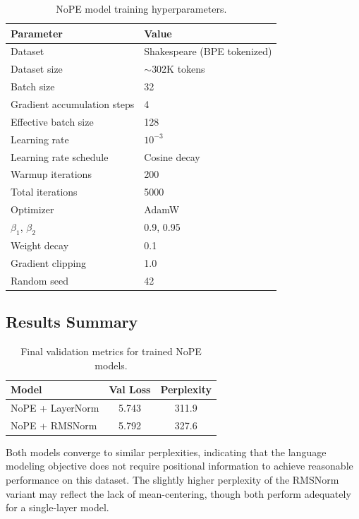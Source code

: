 \documentclass[11pt]{article}
\begin{document}
\begin{table}[htbp]
\centering
\small
\begin{tabular}{ll}
\toprule
\textbf{Parameter} & \textbf{Value} \\
\midrule
Dataset & Shakespeare (BPE tokenized) \\
Dataset size & $\sim$302K tokens \\
Batch size & 32 \\
Gradient accumulation steps & 4 \\
Effective batch size & 128 \\
Learning rate & $10^{-3}$ \\
Learning rate schedule & Cosine decay \\
Warmup iterations & 200 \\
Total iterations & 5000 \\
Optimizer & AdamW \\
$\beta_1$, $\beta_2$ & 0.9, 0.95 \\
Weight decay & 0.1 \\
Gradient clipping & 1.0 \\
Random seed & 42 \\
\bottomrule
\end{tabular}
\caption{NoPE model training hyperparameters.}
\label{tab:nope-training}
\end{table}

\subsection{Results Summary}

\begin{table}[htbp]
\centering
\small
\begin{tabular}{lcc}
\toprule
\textbf{Model} & \textbf{Val Loss} & \textbf{Perplexity} \\
\midrule
NoPE + LayerNorm & 5.743 & 311.9 \\
NoPE + RMSNorm & 5.792 & 327.6 \\
\bottomrule
\end{tabular}
\caption{Final validation metrics for trained NoPE models.}
\label{tab:nope-results}
\end{table}

Both models converge to similar perplexities, indicating that the language modeling objective does not require positional information to achieve reasonable performance on this dataset. The slightly higher perplexity of the RMSNorm variant may reflect the lack of mean-centering, though both perform adequately for a single-layer model.
\end{document}

